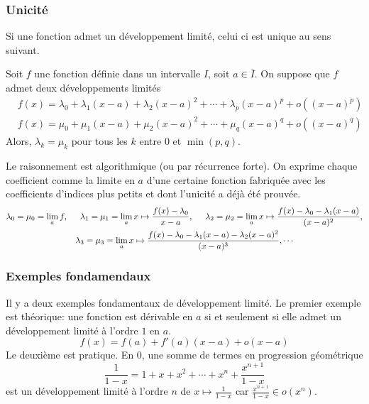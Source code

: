 \subsubsection{Unicité}
Si une fonction admet un développement limité, celui ci est unique au sens suivant.
\begin{prop}
 Soit $f$ une fonction définie dans un intervalle $I$, soit $a\in\overline{I}$. On suppose que $f$ admet deux développements limités
\begin{align*}
 &f(x)=\lambda_0 + \lambda_1(x-a)+\lambda_2(x-a)^2+\cdots +\lambda_p(x-a)^p +o((x-a)^p)\\
 &f(x)=\mu_0 + \mu_1(x-a)+\mu_2(x-a)^2+\cdots +\mu_q(x-a)^q +o((x-a)^q)
\end{align*}
Alors, $\lambda_k=\mu_k$ pour tous les $k$ entre $0$ et $\min(p,q)$.
\end{prop}
\begin{demo}
Le raisonnement est algorithmique (ou par récurrence forte). On exprime chaque coefficient comme la limite en $a$ d'une certaine fonction fabriquée avec les coefficients d'indices plus petits et dont l'unicité a déjà été prouvée.
\begin{multline*}
  \lambda_0 = \mu_0 = \lim_{a}f,\hspace{0.5cm} \lambda_1 = \mu_1 = \lim_{a}x\mapsto \frac{f(x) - \lambda_0}{x-a},\hspace{0.5cm}
\lambda_2 = \mu_2 = \lim_{a}x\mapsto \frac{f(x) - \lambda_0-\lambda_1(x-a)}{(x-a)^2},\\
\lambda_3 = \mu_3 = \lim_{a}x\mapsto \frac{f(x) - \lambda_0-\lambda_1(x-a) - \lambda_2(x-a)^2}{(x-a)^3}, \cdots
\end{multline*}
\end{demo}

\subsubsection{Exemples fondamendaux}
Il y a deux exemples fondamentaux de développement limité. Le premier exemple est théorique: une fonction est dérivable en $a$ si et seulement si elle admet un développement limité à l'ordre $1$ en $a$.
\begin{displaymath}
  f(x) = f(a) + f'(a)(x-a) + o(x-a)
\end{displaymath}
Le deuxième est pratique. En $0$, une somme de termes en progression géométrique
\begin{displaymath}
 \frac{1}{1-x}=1+x+x^2+\cdots+x^n+\frac{x^{n+1}}{1-x}
\end{displaymath}
est un développement limité à l'ordre $n$ de $x\mapsto \frac{1}{1-x}$ car $\frac{x^{n+1}}{1-x}\in o\left(x^n\right)$. 
